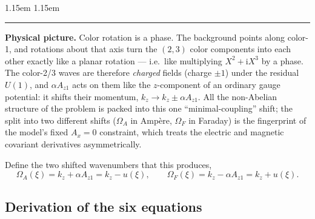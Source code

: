 \documentclass[11pt,a4paper]{article}
\numberwithin{equation}{section}
\theoremstyle{remark}
\newenvironment{intuition}%
{\par\medskip\noindent
 \begin{list}{}{\leftmargin 1.15em \rightmargin 1.15em \listparindent 0pt
 \itemindent 0pt \parsep 2pt \topsep 2pt}\item\relax
 \small\textcolor{intu}{\rule[-0.6ex]{2.6pt}{2.4ex}}\hspace{0.55em}%
 \textcolor{intu}{\textbf{Physical picture.}}\hspace{0.5em}\ignorespaces}%
{\end{list}\medskip}
\newcommand{\kz}{k_z}
\newcommand{\OmA}{\Omega_A}
\newcommand{\OmF}{\Omega_F}
\newcommand{\Az}{A_{z1}}
\newcommand{\ii}{\mathrm{i}}
\begin{document}
\begin{intuition}
Color rotation is a phase. The background points along color-1, and
rotations about that axis turn the $(2,3)$ color components into each
other exactly like a planar rotation --- i.e.\ like multiplying
$X^2+\ii X^3$ by a phase. The color-2/3 waves are therefore
\emph{charged} fields (charge $\pm1$) under the residual $U(1)$, and
$\alpha\Az$ acts on them like the $z$-component of an ordinary gauge
potential: it shifts their momentum, $\kz\to\kz\pm\alpha\Az$. All the
non-Abelian structure of the problem is packed into this one
``minimal-coupling'' shift; the split into two different shifts
($\OmA$ in Amp\`ere, $\OmF$ in Faraday) is the fingerprint of the
model's fixed $A_x=0$ constraint, which treats the electric and magnetic
covariant derivatives asymmetrically.
\end{intuition}

Define the two shifted wavenumbers that this produces,
\begin{equation}
\boxed{\;\OmA(\xi)=\kz+\alpha\Az=\kz-u(\xi),\qquad
\OmF(\xi)=\kz-\alpha\Az=\kz+u(\xi).\;}
\label{eq:Omdef}
\end{equation}

\subsection{Derivation of the six equations}
\label{ssec:sixderive}
\end{document}
